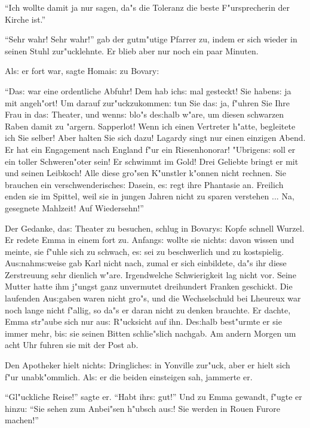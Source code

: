 \documentclass[oneside,12pt]{book}
\newcommand{\s}{s:}%
\begin{document}
"`Ich wollte damit ja nur sagen, da"s die Toleranz die beste
F"ursprecherin der Kirche ist."'

"`Sehr wahr! Sehr wahr!"' gab der gutm"utige Pfarrer zu, indem er
sich wieder in seinen Stuhl zur"ucklehnte. Er blieb aber nur noch
ein paar Minuten.

Al{\s} er fort war, sagte Homai{\s} zu Bovary:

"`Da{\s} war eine ordentliche Abfuhr! Dem hab ich{\s} mal
gesteckt! Sie haben{\s} ja mit angeh"ort! Um darauf
zur"uckzukommen: tun Sie da{\s} ja, f"uhren Sie Ihre Frau in
da{\s} Theater, und wenn{\s} blo"s de{\s}halb w"are, um diesen
schwarzen Raben damit zu "argern. Sapperlot! Wenn ich einen
Vertreter h"atte, begleitete ich Sie selber! Aber halten Sie sich
dazu! Lagardy singt nur einen einzigen Abend. Er hat ein
Engagement nach England f"ur ein Riesenhonorar! "Ubrigen{\s} soll
er ein toller Schweren"oter sein! Er schwimmt im Gold! Drei
Geliebte bringt er mit und seinen Leibkoch! Alle diese gro"sen
K"unstler k"onnen nicht rechnen. Sie brauchen ein
verschwenderische{\s} Dasein, e{\s} regt ihre Phantasie an.
Freilich enden sie im Spittel, weil sie in jungen Jahren nicht zu
sparen verstehen ... Na, gesegnete Mahlzeit! Auf Wiedersehn!"'

Der Gedanke, da{\s} Theater zu besuchen, schlug in Bovary{\s}
Kopfe schnell Wurzel. Er redete Emma in einem fort zu. Anfang{\s}
wollte sie nicht{\s} davon wissen und meinte, sie f"uhle sich zu
schwach, e{\s} sei zu beschwerlich und zu kostspielig.
Au{\s}nahm{\s}weise gab Karl nicht nach, zumal er sich einbildete,
da"s ihr diese Zerstreuung sehr dienlich w"are. Irgendwelche
Schwierigkeit lag nicht vor. Seine Mutter hatte ihm j"ungst ganz
unvermutet dreihundert Franken geschickt. Die laufenden
Au{\s}gaben waren nicht gro"s, und die Wechselschuld bei Lheureux
war noch lange nicht f"allig, so da"s er daran nicht zu denken
brauchte. Er dachte, Emma str"aube sich nur au{\s} R"ucksicht auf
ihn. De{\s}halb best"urmte er sie immer mehr, bi{\s} sie seinen
Bitten schlie"slich nachgab. Am andern Morgen um acht Uhr fuhren
sie mit der Post ab.

Den Apotheker hielt nicht{\s} Dringliche{\s} in Yonville zur"uck,
aber er hielt sich f"ur unabk"ommlich. Al{\s} er die beiden
einsteigen sah, jammerte er.

"`Gl"uckliche Reise!"' sagte er. "`Habt ihr{\s} gut!"' Und zu Emma
gewandt, f"ugte er hinzu: "`Sie sehen zum Anbei"sen h"ubsch
au{\s}! Sie werden in Rouen Furore machen!"'
\end{document}
